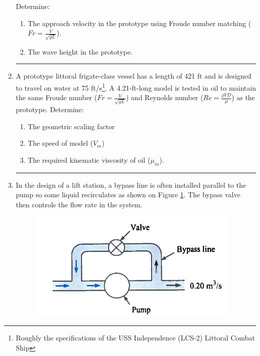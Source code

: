 \documentclass[12pt]{article}
\begin{document}
\begin{enumerate}
Determine:
\begin{enumerate}
\item The approach velocity in the prototype using Froude number matching ($Fr = \frac{V}{\sqrt{gL}}$).
\item The wave height in the prototype.
\end{enumerate}
\noindent\rule{\linewidth}{0.4pt}
\clearpage
\item A prototype littoral frigate-class vessel has a length of 421 ft and is designed to travel on water at 75 ft/s\footnote{Roughly the specifications of the USS Independence (LCS-2) Littoral Combat Ship}. A 4.21-ft-long model is tested in oil to maintain the same Froude number ($Fr = \frac{V}{\sqrt{gL}}$) and Reynolds number ($Re = \frac{\rho V D}{\mu}$) as the prototype. Determine:
\begin{enumerate}
\item The geometric scaling factor
\item The speed of model ($V_m$) 
\item The required kinematic viscosity of oil ($\mu_m$). 
\end{enumerate}

\noindent\rule{\linewidth}{0.4pt}
\clearpage
\item In the design of a lift station, a bypass line is often installed parallel to the pump so some liquid recirculates as shown on Figure \ref{fig:pump-bypass}. The bypass valve then controls the flow rate in the system.

\begin{figure}[h!] %
   \centering
   \includegraphics[width=4in]{pump-bypass.png} 
   \caption{}
   \label{fig:pump-bypass}
\end{figure}


\end{enumerate}
\end{document}
